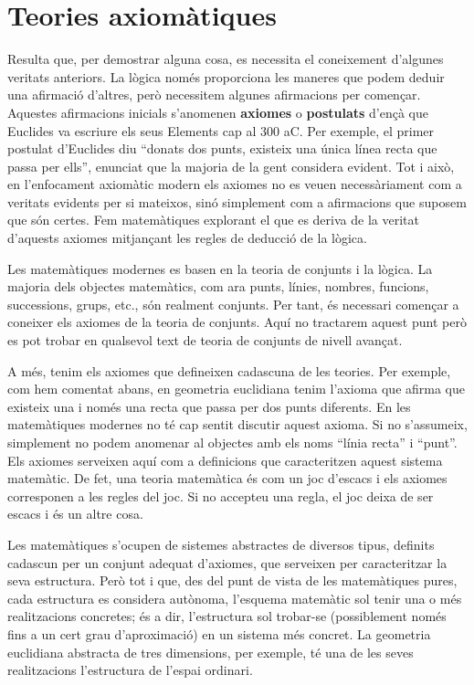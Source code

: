 \section{Teories axiomàtiques}

Resulta que, per demostrar alguna cosa, es necessita el coneixement
d'algunes veritats anteriors. La lògica només proporciona les
maneres que podem deduir una afirmació d'altres, però necessitem
algunes afirmacions per començar. Aquestes afirmacions inicials
s'anomenen \textbf{axiomes} o \textbf{postulats} d'ençà que Euclides
va escriure els seus Elements cap al 300 aC. Per exemple, el primer postulat
d'Euclides diu \enquote{donats dos punts, existeix una única línea recta
que passa per ells}, enunciat que la majoria de la gent considera evident.
Tot i això, en l'enfocament axiomàtic modern els axiomes no es veuen
necessàriament com a veritats evidents per si mateixos, sinó
simplement com a afirmacions que suposem que són certes. Fem matemàtiques explorant el que es deriva de la veritat d'aquests axiomes mitjançant les regles de deducció de la lògica.

\bigskip

Les matemàtiques modernes es basen en la teoria de conjunts i la lògica. La majoria dels objectes matemàtics, com ara punts, línies,
nombres, funcions, successions, grups, etc., són realment conjunts. Per
tant, és necessari començar a coneixer els axiomes de la teoria de
conjunts. Aquí no tractarem aquest punt però es pot trobar en
qualsevol text de teoria de conjunts de nivell avançat.

A més, tenim els axiomes que defineixen cadascuna de les teories. Per
exemple, com hem comentat abans, en geometria euclidiana tenim l'axioma que
afirma que existeix una i només una recta que passa per dos punts
diferents. En les matemàtiques modernes no té cap sentit discutir
aquest axioma. Si no s'assumeix, simplement no podem anomenar al objectes
amb els noms \enquote{línia recta} i \enquote{punt}. Els axiomes serveixen aquí
com a definicions que caracteritzen aquest sistema matemàtic. De fet,
una teoria matemàtica és com un joc d'escacs i els axiomes
corresponen a les regles del joc. Si no accepteu una regla, el joc deixa de
ser escacs i és un altre cosa.

\bigskip

Les matemàtiques s'ocupen de sistemes abstractes de diversos tipus,
definits cadascun per un conjunt adequat d'axiomes, que serveixen per
caracteritzar la seva estructura. Però tot i que, des del punt de vista
de les matemàtiques pures, cada estructura es considera autònoma,
l'esquema matemàtic sol tenir una o més realitzacions concretes;
és a dir, l'estructura sol trobar-se (possiblement només fins a un
cert grau d'aproximació) en un sistema més concret. La geometria
euclidiana abstracta de tres dimensions, per exemple, té una de les
seves realitzacions l'estructura de l'espai ordinari.

